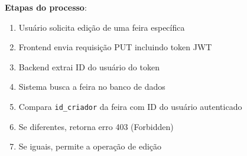 \documentclass[12pt,a4paper]{article}
\begin{document}
\textbf{Etapas do processo}:
\begin{enumerate}
    \item Usuário solicita edição de uma feira específica
    \item Frontend envia requisição PUT incluindo token JWT
    \item Backend extrai ID do usuário do token
    \item Sistema busca a feira no banco de dados
    \item Compara \texttt{id\_criador} da feira com ID do usuário autenticado
    \item Se diferentes, retorna erro 403 (Forbidden)
    \item Se iguais, permite a operação de edição
\end{enumerate}
\end{document}
